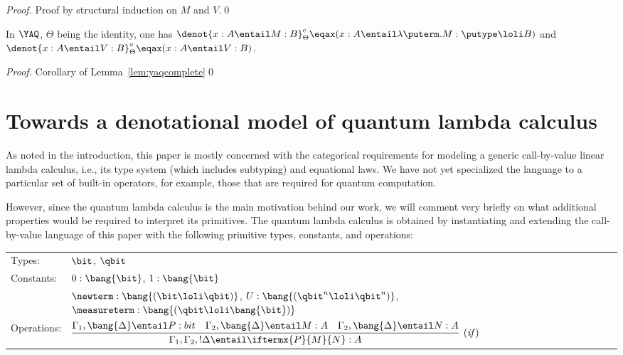 \documentclass{llncs}
\begin{document}
\begin{proof}
  Proof by structural induction on $M$ and $V$.\qed
\end{proof}

\begin{theorem}
  In $\YAQ$, $\Theta$ being the identity, one has
  $\denot{x:A\entail M:B}^c_\Theta \eqax (x:A\entail
  \lambda\puterm.M:\putype\loli B)$ and
  $\denot{x:A\entail V:B}^v_\Theta \eqax (x:A\entail V:B)$.
\end{theorem}

\begin{proof}
  Corollary of Lemma~\ref{lem:yaqcomplete}\qed
\end{proof}

\section{Towards a denotational model of quantum lambda calculus}

As noted in the introduction, this paper is mostly concerned with the
categorical requirements for modeling a generic call-by-value linear
lambda calculus, i.e., its type system (which includes subtyping) and
equational laws. We have not yet specialized the language to a
particular set of built-in operators, for example, those that are
required for quantum computation.

However, since the quantum lambda calculus {\cite{selinger05lambda}}
is the main motivation behind our work, we will comment very briefly
on what additional properties would be required to interpret its
primitives. The quantum lambda calculus is obtained by instantiating
and extending the call-by-value language of this paper with the
following primitive types, constants, and operations:

\begin{center}
  \begin{tabular}{ll}
    Types: & $\bit$, $\qbit$ \\
    Constants: & $0:\bang{\bit}$, $1:\bang{\bit}$\\
    & $\newterm:\bang{(\bit \loli \qbit)}$, $U:\bang{(\qbit^n\loli\qbit^n)}$, $\measureterm:\bang{(\qbit \loli \bang{\bit})}$\\
    Operations: & $\vcenter{
      \infer[({\it if})]
      { \Gamma_1, \Gamma_2, !\Delta \entail \iftermx{P}{M}{N} : A}
      {
        \Gamma_1, \bang{\Delta} \entail P : bit
        &
        \Gamma_2, \bang{\Delta} \entail M : A
        &
        \Gamma_2, \bang{\Delta} \entail N : A
        }}$
  \end{tabular}
\end{center}
\end{document}
